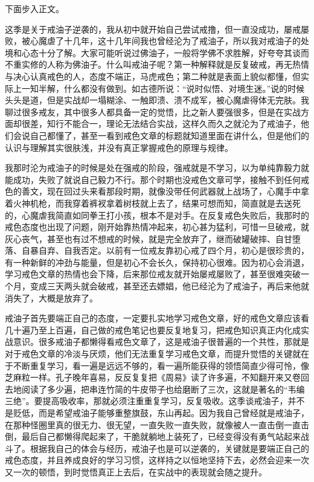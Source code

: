 下面步入正文。

这季是关于戒油子逆袭的，我从初中就开始自己尝试戒撸，但一直没成功，屡戒屡败，被心魔虐了十几年，这十几年间我也曾经沦为了戒油子，所以我对戒油子的处境和心态十分了解。大家可能听说过佛油子，一般将学佛不求胜解，好夸夸其谈而不重实修的人称为佛油子。什么叫戒油子呢？第一种解释就是反复破戒，再无热情与决心认真戒色的人，态度不端正，马虎戒色；第二种就是表面上貌似都懂，但实际上一知半解，什么都没有做到。如古德所说：“说时似悟、对境生迷。”说的时候头头是道，但是实战却一塌糊涂、一触即溃、溃不成军，被心魔虐得体无完肤。我聊过很多戒友，其中很多人都具备一定的觉悟，比之新人要强很多，但是在实战方面却很差，知行不能合一，理论无法结合实战，这样久而久之就沦为了戒油子，他们会说自己都懂了，甚至一看到戒色文章的标题就知道里面在讲什么，但是他们的认识与理解其实很肤浅，并没有真正掌握戒色的原理与规律。

我那时沦为戒油子的时候是处在强戒的阶段，强戒就是不学习，以为单纯靠毅力就能成功，失败了就说自己毅力不行。那个时期也没戒色文章可学，接触不到任何戒色的善文，现在回过头来看那段时期，就像没带任何武器就上战场了，心魔手中拿着火神机枪，而我穿着裤衩拿着树枝就上去了，结果可想而知，简直就是去送死的，心魔虐我简直如同拳王打小孩，根本不是对手。在反复戒色失败后，我那时的戒色态度也出现了问题，刚开始靠热情冲起来，初心甚为猛利，可惜一旦破戒，就灰心丧气，甚至也有过不想戒的时候，就是完全放弃了，继而破罐破摔、自甘堕落、自暴自弃、自我否定。以前有一位戒友靠初心戒了四个月，初心是很珍贵的，有一种新鲜的冲劲与能量，但是初心不会长久，保持初心很难。因为初心会消退，学习戒色文章的热情也会下降，后来那位戒友就开始屡戒屡败了，甚至很难突破一个月，变成三天两头就会破戒，甚至还去嫖娼，他已经沦为了戒油子，再后来他就消失了，大概是放弃了。

戒油子首先要端正自己的态度，一定要扎实地学习戒色文章，好的戒色文章应该看几十遍乃至上百遍，自己做的戒色笔记也要反复地复习，把戒色知识真正内化成实战意识。很多戒油子都懒得看戒色文章了，这是戒油子很普遍的一个共性，那就是对于戒色文章的冷淡与厌烦，他们无法重复学习戒色文章，而提升觉悟的关键就在于不断重复学习，看一遍是远远不够的，看一遍所能获得的领悟简直少得可怜，像芝麻粒一样。孔子晚年喜易，反反复复把《周易》读了许多遍，不知翻开来又卷回去地阅读了多少遍，把串连竹简的牛皮带子也给磨断了三次，这就是著名的“韦编三绝”。要提高吸收率，那就必须注重重复学习，反复吸收。这季谈戒油子，并不是贬低，而是希望戒油子能够重整旗鼓，东山再起。因为我自己曾经就是戒油子，在那种怪圈里真的很无力、很无望，一直失败一直失败，就像被人一直击倒一直击倒，最后自己都懒得爬起来了，干脆就躺地上装死了，已经变得没有勇气站起来战斗了。根据我自己的体会与经历，戒油子也是可以逆袭的，关键就是要端正自己的戒色态度，并且养成良好的学习习惯，这样持之以恒地坚持下去，必然会迎来一次又一次的顿悟，到时觉悟真正上去后，在实战中的表现就会随之提升。

